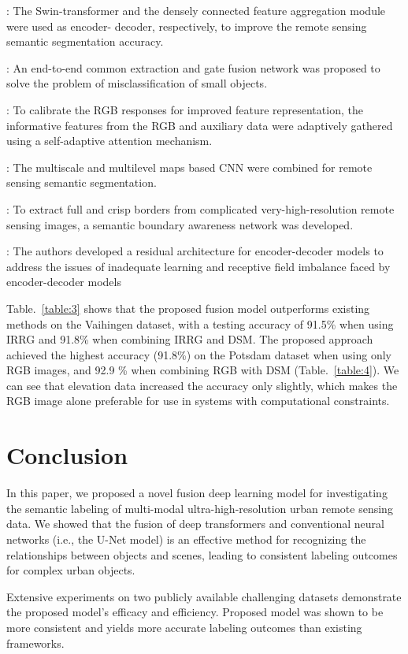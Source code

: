 \documentclass[journal]{IEEEtran}
\begin{document}
 \cite{9681903}: The Swin-transformer and the densely connected feature aggregation module were used as encoder- decoder, respectively, to improve the remote sensing semantic segmentation accuracy. 

 \cite{9538389}: An end-to-end common extraction and gate fusion network was proposed to solve the problem of misclassification of small objects. 

 \cite{9519842}: To calibrate the RGB responses for improved feature representation, the informative features from the RGB and auxiliary data were adaptively gathered using a self-adaptive attention mechanism. 

 \cite{9258402}:  The multiscale and multilevel maps based CNN were combined for remote sensing semantic segmentation. 

 \cite{9345482}:  To extract full and crisp borders from complicated very-high-resolution remote sensing images, a semantic boundary awareness network was developed.

 \cite{rs10091429}: The authors developed a residual architecture for encoder-decoder models to address the issues of inadequate learning and receptive field imbalance faced by encoder-decoder models 

Table.~\ref{table:3} shows that the proposed fusion model outperforms existing methods on the Vaihingen dataset, with a testing accuracy of 91.5\% when using IRRG and 91.8\% when combining IRRG and DSM. 
The proposed approach achieved the highest accuracy (91.8\%) on the Potsdam dataset when using only RGB images, and 92.9 \% when combining RGB with DSM (Table.~\ref{table:4}). We can see that elevation data increased the accuracy only slightly, which makes the RGB image alone preferable for use in systems with computational constraints.
\section{Conclusion}
In this paper, we proposed a novel fusion deep learning model for investigating the semantic labeling of multi-modal ultra-high-resolution urban remote sensing data. We showed that the fusion of deep transformers and conventional neural networks (i.e., the U-Net model) is an effective method for recognizing the relationships between objects and scenes, leading to consistent labeling outcomes for complex urban objects.

Extensive experiments on two publicly available challenging datasets demonstrate the proposed model's efficacy and efficiency. Proposed model was shown to be more consistent and yields more accurate labeling outcomes than existing frameworks. 
\end{document}
